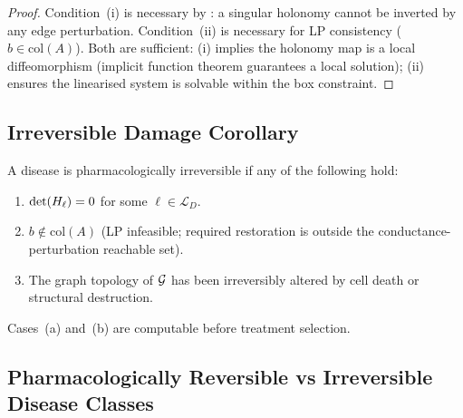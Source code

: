 \begin{proof}
Condition~(i) is necessary by : a singular holonomy
cannot be inverted by any edge perturbation.  Condition~(ii) is necessary for
LP consistency ($b \in \mathrm{col}(A)$).  Both are sufficient: (i) implies
the holonomy map is a local diffeomorphism (implicit function theorem
guarantees a local solution); (ii) ensures the linearised system is solvable
within the box constraint.
\end{proof}

\subsection{Irreversible Damage Corollary}
\label{subsec:ch09-irreversible}

\begin{corollary}
\label{cor:ch09-irreversible}
A disease is pharmacologically irreversible if any of the following hold:
\begin{enumerate}[label=(\alph*)]
  \item $\det(H_\ell) = 0$ for some $\ell \in \mathcal{L}_D$.
  \item $b \notin \mathrm{col}(A)$ (LP infeasible; required restoration is
    outside the conductance-perturbation reachable set).
  \item The graph topology of $\mathcal{G}$ has been irreversibly altered by cell
    death or structural destruction.
\end{enumerate}
Cases~(a) and~(b) are computable before treatment selection.
\end{corollary}

\subsection{Pharmacologically Reversible vs Irreversible Disease Classes}
\label{subsec:ch09-disease-classes}

